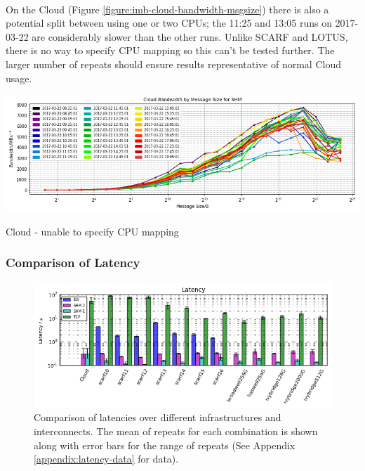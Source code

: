 \documentclass{article}
\begin{document}
            \paragraph{} On the Cloud (Figure \ref{figure:imb-cloud-bandwidth-msgsize}) there is also a potential split between using one or two CPUs; the 11:25 and 13:05 runs on 2017-03-22 are considerably slower than the other runs. Unlike SCARF and LOTUS, there is no way to specify CPU mapping so this can't be tested further. The larger number of repeats should ensure results representative of normal Cloud usage.

            \begin{center}
                \includegraphics[width=\textwidth]{cloud_bandwidth-msgsize_shm}
                \captionsetup{type=figure}
                \caption{Cloud - unable to specify CPU mapping}
                \label{figure:imb-cloud-bandwidth-msgsize}
            \end{center}

        \subsubsection{Comparison of Latency}
            \label{analyse-results-imb-latency}

            \begin{figure}[H]
                \centering
                \includegraphics[width=\textwidth]{compare_latency-hostgroup}
                \caption{Comparison of latencies over different infrastructures and interconnects. The mean of repeats for each combination is shown along with error bars for the range of repeats (See Appendix \ref{appendix:latency-data} for data).}
                \label{fig:compare_latency-hostgroup}
            \end{figure}
\end{document}
